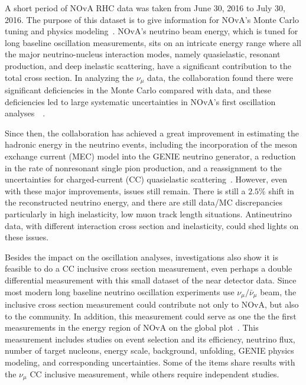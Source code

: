 \documentclass[a4paper, 11pt]{article} %
\begin{document}
A short period of NOvA RHC data was taken from June 30, 2016 to July 30, 2016. The purpose of this dataset is to give information for NOvA's Monte Carlo tuning and physics modeling~\cite{Patterson:2016_1}. NOvA's neutrino beam energy, which is tuned for long baseline oscillation measurements, sits on an intricate energy range where all the major neutrino-nucleus interaction modes, namely quasielastic, resonant production, and deep inelastic scattering, have a significant contribution to the total cross section. In analyzing the $\nu_\mu$ data, the collaboration found there were significant deficiencies in the Monte Carlo compared with data, and these deficiencies led to large systematic uncertainties in NOvA's first oscillation analyses~\cite{NOvA:2016_1}~\cite{NOvA:2016_2}.

Since then, the collaboration has achieved a great improvement in estimating the hadronic energy in the neutrino events, including the incorporation of the meson exchange current (MEC) model into the GENIE neutrino generator, a reduction in the rate of nonresonant single pion production, and a reassignment to the uncertainties for charged-current (CC) quasielastic scattering~\cite{Wolcott:2016_1}. However, even with these major improvements, issues still remain. There is still a $2.5\%$ shift in the reconstructed neutrino energy, and there are still data/MC discrepancies particularly in  high inelasticity, low muon track length situations. Antineutrino data, with different interaction cross section and inelasticity, could shed lights on these issues.

Besides the impact on the oscillation analyses, investigations also show it is feasible to do a CC inclusive cross section measurement, even perhaps a double differential measurement with this small dataset of the near detector data. Since most modern long baseline neutrino oscillation experiments use $\nu_\mu/\bar{\nu}_\mu$ beam, the inclusive cross section measurement could contribute not only to NOvA, but also to the community. In addition, this measurement could serve as one the the first measurements in the energy region of NOvA on the global plot~\cite{Zeller:2015_1}. This measurement includes studies on event selection and its efficiency, neutrino flux, number of target nucleons, energy scale, background, unfolding, GENIE physics modeling, and corresponding uncertainties. Some of the items share results with the $\nu_\mu$ CC inclusive measurement, while others require independent studies.
\end{document}
